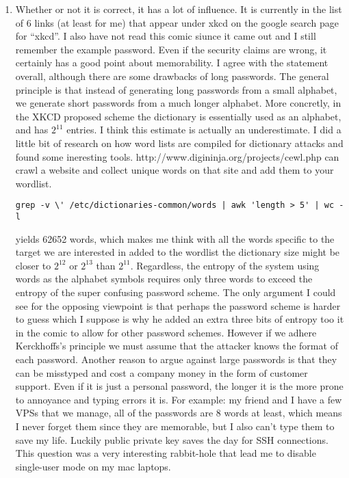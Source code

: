 \documentclass{article}
\begin{document}
\begin{enumerate}
  \item
    Whether or not it is correct, it has a lot of influence. It is currently in the list of 6 links (at least for me) that appear under xkcd on the google search page for ``xkcd''. I also have not read this comic siunce it came out and I still remember the example password. Even if the security claims are wrong, it certainly has a good point about memorability. I agree with the statement overall, although there are some drawbacks of long passwords. The general principle is that instead of generating long passwords from a small alphabet, we generate short passwords from a much longer alphabet. More concretly, in the XKCD proposed scheme the dictionary is essentially used as an alphabet, and has $2^{11}$ entries. I think this estimate is actually an underestimate. I did a little bit of research on how word lists are compiled for dictionary attacks and found some ineresting tools. http://www.digininja.org/projects/cewl.php can crawl a website and collect unique words on that site and add them to your wordlist. \small \begin{verbatim}grep -v \' /etc/dictionaries-common/words | awk 'length > 5' | wc -l\end{verbatim} \normalsize yields 62652 words, which makes me think with all the words specific to the target we are interested in added to the wordlist the dictionary size might be closer to $2^{12}$ or $2^{13}$ than $2^{11}$. Regardless, the entropy of the system using words as the alphabet symbols requires only three words to exceed the entropy of the super confusing password scheme. The only argument I could see for the opposing viewpoint is that perhaps the password scheme is harder to guess which I suppose is why he added an extra three bits of entropy too it in the comic to allow for other password schemes. However if we adhere Kerckhoffs's principle we must assume that the attacker knows the format of each password. Another reason to argue against large passwords is that they can be misstyped and cost a company money in the form of customer support. Even if it is just a personal password, the longer it is the more prone to annoyance and typing errors it is. For example: my friend and I have a few VPSs that we manage, all of the passwords are 8 words at least, which means I never forget them since they are memorable, but I also can't type them to save my life. Luckily public private key saves the day for SSH connections. This question was a very interesting rabbit-hole that lead me to disable single-user mode on my mac laptops. 


\end{enumerate}
\end{document}
